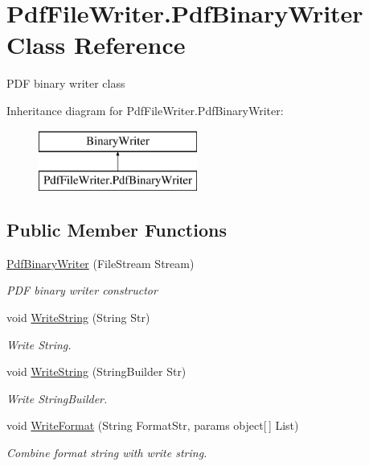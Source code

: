 \hypertarget{class_pdf_file_writer_1_1_pdf_binary_writer}{}\section{Pdf\+File\+Writer.\+Pdf\+Binary\+Writer Class Reference}
\label{class_pdf_file_writer_1_1_pdf_binary_writer}


P\+DF binary writer class  


Inheritance diagram for Pdf\+File\+Writer.\+Pdf\+Binary\+Writer\+:\begin{figure}[H]
\begin{center}
\leavevmode
\includegraphics[height=2.000000cm]{class_pdf_file_writer_1_1_pdf_binary_writer}
\end{center}
\end{figure}
\subsection*{Public Member Functions}
\begin{DoxyCompactItemize}
\item 
\hyperlink{class_pdf_file_writer_1_1_pdf_binary_writer_a7229c552194b5cf294a79c8f11a36995}{Pdf\+Binary\+Writer} (File\+Stream Stream)
\begin{DoxyCompactList}\small\item\em P\+DF binary writer constructor \end{DoxyCompactList}\item 
void \hyperlink{class_pdf_file_writer_1_1_pdf_binary_writer_aca423e18448e60765e2f39370deff853}{Write\+String} (String Str)
\begin{DoxyCompactList}\small\item\em Write String. \end{DoxyCompactList}\item 
void \hyperlink{class_pdf_file_writer_1_1_pdf_binary_writer_a6451bc74c7c47e93a7fdc7ebb38e3adf}{Write\+String} (String\+Builder Str)
\begin{DoxyCompactList}\small\item\em Write String\+Builder. \end{DoxyCompactList}\item 
void \hyperlink{class_pdf_file_writer_1_1_pdf_binary_writer_a014bb5b7c68575e51db97a72405bf37b}{Write\+Format} (String Format\+Str, params object\mbox{[}$\,$\mbox{]} List)
\begin{DoxyCompactList}\small\item\em Combine format string with write string. \end{DoxyCompactList}\end{DoxyCompactItemize}


